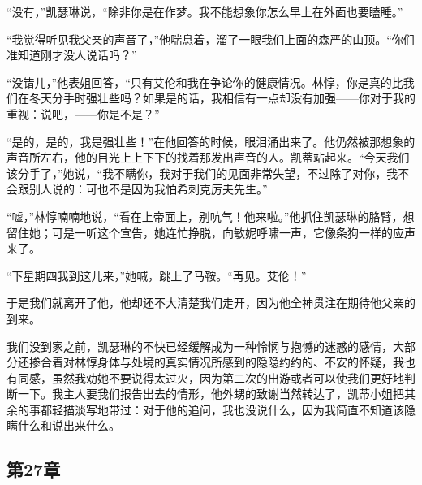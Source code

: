 \par “没有，”凯瑟琳说，“除非你是在作梦。我不能想象你怎么早上在外面也要瞌睡。”
\par “我觉得听见我父亲的声音了，”他喘息着，溜了一眼我们上面的森严的山顶。“你们准知道刚才没人说话吗？”
\par “没错儿，”他表姐回答，“只有艾伦和我在争论你的健康情况。林惇，你是真的比我们在冬天分手时强壮些吗？如果是的话，我相信有一点却没有加强——你对于我的重视：说吧，——你是不是？”
\par “是的，是的，我是强壮些！”在他回答的时候，眼泪涌出来了。他仍然被那想象的声音所左右，他的目光上上下下的找着那发出声音的人。凯蒂站起来。“今天我们该分手了，”她说，“我不瞒你，我对于我们的见面非常失望，不过除了对你，我不会跟别人说的：可也不是因为我怕希刺克厉夫先生。”
\par “嘘，”林惇喃喃地说，“看在上帝面上，别吭气！他来啦。”他抓住凯瑟琳的胳臂，想留住她；可是一听这个宣告，她连忙挣脱，向敏妮呼啸一声，它像条狗一样的应声来了。
\par “下星期四我到这儿来，”她喊，跳上了马鞍。“再见。艾伦！”
\par 于是我们就离开了他，他却还不大清楚我们走开，因为他全神贯注在期待他父亲的到来。
\par 我们没到家之前，凯瑟琳的不快已经缓解成为一种怜悯与抱憾的迷惑的感情，大部分还掺合着对林惇身体与处境的真实情况所感到的隐隐约约的、不安的怀疑，我也有同感，虽然我劝她不要说得太过火，因为第二次的出游或者可以使我们更好地判断一下。我主人要我们报告出去的情形，他外甥的致谢当然转达了，凯蒂小姐把其余的事都轻描淡写地带过：对于他的追问，我也没说什么，因为我简直不知道该隐瞒什么和说出来什么。


\subsection{第27章}

